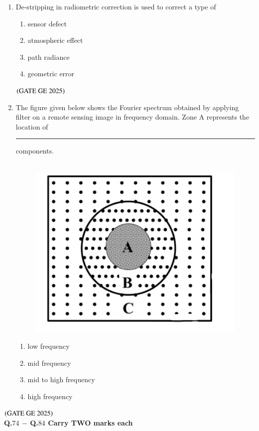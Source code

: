 \documentclass[journal,12pt,onecolumn]{IEEEtran}
\theoremstyle{remark}
\begin{document}
\begin{enumerate}
\item De-stripping in radiometric correction is used to correct a type of
\begin{enumerate}
\item sensor defect
\item atmospheric effect
\item path radiance
\item geometric error
\end{enumerate}
\hfill $\left(\text{GATE GE 2025}\right)$
\bigskip
\item The figure given below shows the Fourier spectrum obtained by applying filter on a remote sensing image in frequency domain.
Zone A represents the location of \rule{2cm}{0.5mm} components. \\
\\
\begin{figure}[H]
    \centering
    \includegraphics[width=0.2\columnwidth]{figs/fig10.png}
    \caption{}
    \label{figs:fig10}
\end{figure}

\begin{enumerate}
\item low frequency
\item mid frequency
\item mid to high frequency
\item high frequency
\end{enumerate}

\end{enumerate}
\hfill $\left(\text{GATE GE 2025}\right)$
\bigskip
\\
\textbf{Q.$74$ $-$ Q.$84$ Carry TWO marks each}
\\
\end{document}
